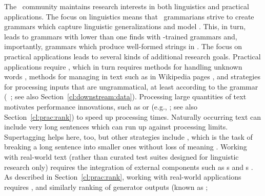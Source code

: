 \documentclass[output=paper
 	        ,biblatex
                ,babelshorthands
                ,newtxmath
                ,draftmode
                ,colorlinks, citecolor=brown
]{langscibook}
\begin{document}
The \delphin\ community maintains research interests in both linguistics and practical
applications. The focus on linguistics means that \delphin\ grammarians strive to create grammars
which capture linguistic generalizations and model . This, in turn, leads
to grammars with lower  than one finds with -trained grammars and,
importantly, grammars which produce well-formed strings in . The focus on
practical applications leads to several kinds of additional research goals. Practical
applications require , which in turn requires methods for handling unknown
words \citep[e.g.,][]{chartmapping}, methods for managing  in text
such as in Wikipedia pages \citep[e.g.,][]{FOY2010a-u}, and strategies for processing inputs that
are ungrammatical, at least according to the grammar (\eg\ \citealp{W11-2923}; see also
Section~\ref{cl:downstream:data}).  Processing large quantities of text motivates performance
innovations, such as  or  (e.g.,
\citealp{matsuzaki2007supertag,dridan2013ubertag}; see also Section~\ref{cl:prac:rank}) to speed up
processing times. Naturally occurring text can include very long sentences which
can run up against processing limits. Supertagging helps here, too, but other strategies include
\textit{}, which is the task of breaking a long sentence into smaller ones
without loss of meaning \citep{muszynska:2016:ACL-SRW}.
Working with real-world text (rather than curated test suites designed for linguistic research only)
requires the integration of external components such as s
\citep[e.g.,][]{Marimon2013a-u} and s
\citep[e.g.,][]{L06-1115,Sch:Usz:Fed:08}. As described in Section~\ref{cl:prac:rank}, working with
real-world applications requires  \citep[e.g.,][]{Tou:Man:Fli:Oep:05}, and
similarly ranking of generator outputs (known as \textit{};
\end{document}
